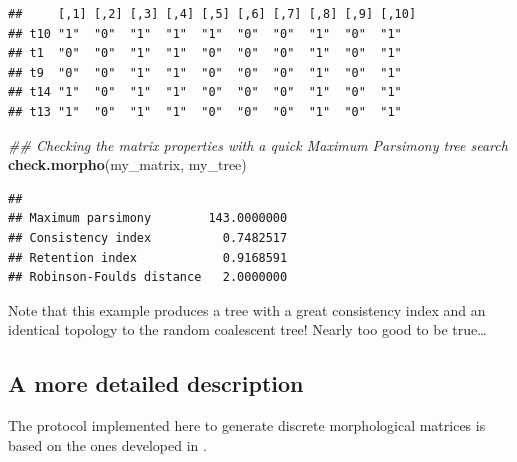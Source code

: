 \documentclass[
]{book}
\newenvironment{Shaded}{\begin{snugshade}}{\end{snugshade}}
\newcommand{\CommentTok}[1]{\textcolor[rgb]{0.56,0.35,0.01}{\textit{#1}}}
\newcommand{\KeywordTok}[1]{\textcolor[rgb]{0.13,0.29,0.53}{\textbf{#1}}}
\newcommand{\NormalTok}[1]{#1}
\begin{document}
\begin{verbatim}
##     [,1] [,2] [,3] [,4] [,5] [,6] [,7] [,8] [,9] [,10]
## t10 "1"  "0"  "1"  "1"  "1"  "0"  "0"  "1"  "0"  "1"  
## t1  "0"  "0"  "1"  "1"  "0"  "0"  "0"  "1"  "0"  "1"  
## t9  "0"  "0"  "1"  "1"  "0"  "0"  "0"  "1"  "0"  "1"  
## t14 "1"  "0"  "1"  "1"  "0"  "0"  "0"  "1"  "0"  "1"  
## t13 "1"  "0"  "1"  "1"  "0"  "0"  "0"  "1"  "0"  "1"
\end{verbatim}

\begin{Shaded}
\begin{Highlighting}[]
\CommentTok{\#\# Checking the matrix properties with a quick Maximum Parsimony tree search}
\KeywordTok{check.morpho}\NormalTok{(my\_matrix, my\_tree)}
\end{Highlighting}
\end{Shaded}

\begin{verbatim}
##                                     
## Maximum parsimony        143.0000000
## Consistency index          0.7482517
## Retention index            0.9168591
## Robinson-Foulds distance   2.0000000
\end{verbatim}

Note that this example produces a tree with a great consistency index and an identical topology to the random coalescent tree!
Nearly too good to be true\ldots{}

\hypertarget{a-more-detailed-description}{%
\subsection{A more detailed description}\label{a-more-detailed-description}}

The protocol implemented here to generate discrete morphological matrices is based on the ones developed in \citep{GuillermeCooper, OReilly2016, puttick2017uncertain, OReilly2017}.
\end{document}
